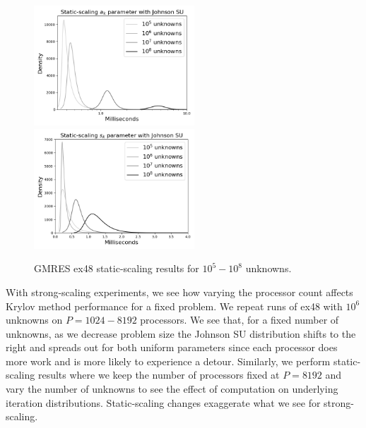\documentclass[sigconf]{acmart}
\begin{document}
\begin{figure}[b]
\centering
\includegraphics[width=6cm]{../plots/GMRES_ex48_1000000_a_k_static_scaling_johnsonsu.png}
\includegraphics[width=6cm]{../plots/PGMRES_ex48_1000000_s_k_static_scaling_johnsonsu.png} 
\caption{GMRES ex48 static-scaling results for $10^5 - 10^8$ unknowns.} \label{fig:static-scaling}
\end{figure}

With strong-scaling experiments, we see how varying the processor count affects Krylov method performance for a fixed problem. We repeat runs of ex48 with  $10^6$ unknowns on $P = 1024 - 8192$ processors. 
We see that, for a fixed number of unknowns, as we decrease problem size the Johnson SU distribution shifts to the right and spreads out for both uniform parameters since each processor does more work and is more likely to experience a detour. 
Similarly, we perform static-scaling results where we keep the number of processors fixed at $P=8192$ and vary the number of unknowns to see the effect of computation on underlying iteration distributions.
Static-scaling changes exaggerate what we see for strong-scaling.

\end{document}
